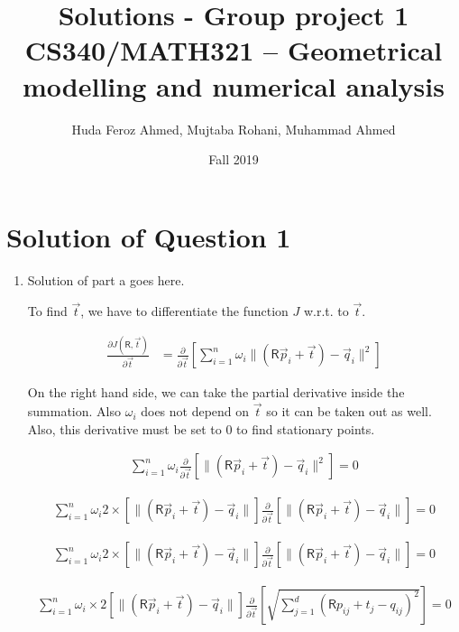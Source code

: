 \documentclass[a4paper, 11pt]{article}
\title{Solutions - Group project 1\\CS340/MATH321 -- Geometrical modelling and numerical analysis}
\date{Fall 2019}
\author{Huda Feroz Ahmed, Mujtaba Rohani, Muhammad Ahmed}
\newcommand{\mat}[1]{\boldsymbol { \mathsf{#1}} }
\newcommand{\norm}[1]{\lVert#1\rVert}
\begin{document}
\maketitle  
\setlength{\parskip}{10pt}
\setlength{\parindent}{0pt}

\section*{Solution of Question 1}
    
\begin{enumerate}[label=\alph*.]
    \item
    Solution of part a goes here.
    
    To find $\Vec{t}$, we have to differentiate the function $J$ w.r.t. to $\Vec{t}$.
    
    \begin{align}
        \frac{\partial J(\mat R,\Vec{t})}{\partial \Vec{t}} & = \frac{\partial}{\partial \Vec{t}} \left[ \sum_{i=1}^{n} \omega_i\norm{(\mat R\vec p_i+\vec t)-\vec q_i}^2 \right]
    \end{align}
    
    On the right hand side, we can take the partial derivative inside the summation. Also $\omega_i$ does not depend on $\vec t$ so it can be taken out as well. Also, this derivative must be set to $0$ to find stationary points.
    
    \begin{align}
         \sum_{i=1}^{n} \omega_i \frac{\partial}{\partial \Vec{t}} \left[ \norm{(\mat R\vec p_i+\vec t)-\vec q_i}^2 \right] = 0
    \end{align} 
    
    \begin{align}
         \sum_{i=1}^{n} \omega_i 2\times \left[ \norm{(\mat R\vec p_i+\vec t)-\vec q_i} \right] \frac{\partial}{\partial \Vec{t}} \left[ \norm{(\mat R\vec p_i+\vec t)-\vec q_i} \right] = 0
    \end{align}
    
    \begin{align}
         \sum_{i=1}^{n} \omega_i 2\times \left[ \norm{(\mat R\vec p_i+\vec t)-\vec q_i} \right] \frac{\partial}{\partial \Vec{t}} \left[ \norm{(\mat R\vec p_i+\vec t)-\vec q_i} \right] = 0
    \end{align}
    
    \begin{align}
         \sum_{i=1}^{n} \omega_i \times 2 \left[ \norm{(\mat R\vec p_i+\vec t)-\vec q_i} \right] \frac{\partial}{\partial \Vec{t}} \left[ \sqrt{\sum_{j=1}^d (\mat R p_{ij}+ t_j- q_{ij})^2} \right] = 0
    \end{align}
    

\end{enumerate}
\end{document}

